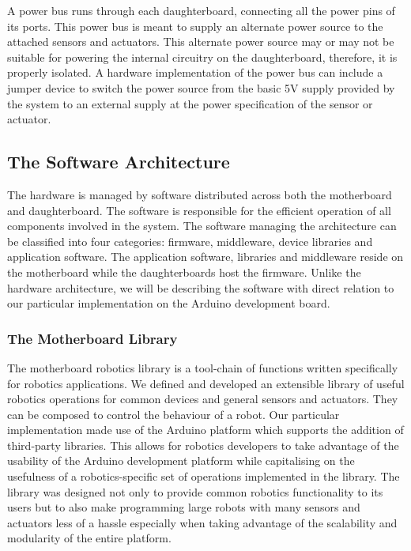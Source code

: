 A power bus runs through each daughterboard, connecting all the power pins of its ports. This power bus is meant to supply an alternate power source to the attached sensors and actuators. This alternate power source may or may not be suitable for powering the internal circuitry on the daughterboard, therefore, it is properly isolated. A hardware implementation of the power bus can include a jumper device to switch the power source from the basic 5V supply provided by the system to an external supply at the power specification of the sensor or actuator. 

\subsection{The Software Architecture} %
\label{sub:the_software_architecture}
The \xten hardware is managed by software distributed across both the motherboard and daughterboard. The software is responsible for the efficient operation of all components involved in the system. The software managing the architecture can be classified into four categories: firmware, middleware, device libraries and application software. The application software, libraries and middleware reside on the motherboard while the daughterboards host the firmware. Unlike the hardware architecture, we will be describing the software with direct relation to our particular implementation on the Arduino development board.
	

	\subsubsection{The Motherboard Library} %
	\label{ssub:the_motherboard_library}

	
	The motherboard robotics library is a tool-chain of functions written specifically for robotics applications. We defined and developed an extensible library of useful robotics operations for common devices and general sensors and actuators. They can be composed to control the behaviour of a robot. Our particular implementation made use of the Arduino platform which supports the addition of third-party libraries. This allows for robotics developers to take advantage of the usability of the Arduino development platform while capitalising on the usefulness of a robotics-specific set of operations implemented in the library.
The library was designed not only to provide common robotics functionality to its users but to also make programming large robots with many sensors and actuators less of a hassle especially when taking advantage of the scalability and modularity of the entire platform.

